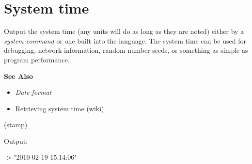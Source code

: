 \pagebreak{}
\section*{System time}

Output the system time (any units will do as long as they are noted)
either by a \emph{system command} or
one built into the language. The system time can be used for debugging,
network information, random number seeds, or something as simple as
program performance.

\textbf{See Also}

\begin{itemize}
\item
  \emph{Date format}
\item
  \href{http://en.wikipedia.org/wiki/System\_time\#Retrieving\_system\_time}{Retrieving
  system time (wiki)}
\end{itemize}


\begin{wideverbatim}

(stamp)

Output:

-> "2010-02-19 15:14:06"

\end{wideverbatim}



% 
